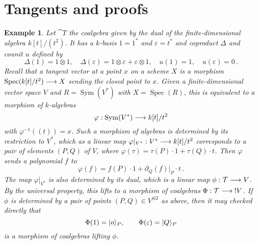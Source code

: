 \documentclass[english,letter paper,12pt,reqno]{article}
\DeclarePairedDelimiter\ket{\lvert}{\rangle}
\theoremstyle{example}
\newtheorem{definition}[theorem]{Definition}
\newtheorem{example}[theorem]{Example}
\numberwithin{equation}{section}
\DeclareMathOperator{\Spec}{Spec}
\DeclareMathOperator{\Sym}{Sym}
\begin{document}
\section{Tangents and proofs}\label{section:example_lifting}





\begin{example}\label{example:tangent_coalgebra} Let $\cat{T}$ the coalgebra given by the dual of the finite-dimensional algebra $k[t]/(t^2)$. It has a $k$-basis $1 = 1^*$ and $\varepsilon = t^*$ and coproduct $\Delta$ and counit $u$ defined by
\[
\Delta(1) = 1 \otimes 1, \quad \Delta( \varepsilon ) = 1 \otimes \varepsilon + \varepsilon \otimes 1, \quad u(1) = 1, \quad u(\varepsilon) = 0\,.
\]
Recall that a tangent vector at a point $x$ on a scheme $X$ is a morphism $\Spec(k[t]/t^2) \lto X$ sending the closed point to $x$. Given a finite-dimensional vector space $V$ and $R = \Sym(V^*)$ with $X = \Spec(R)$, this is equivalent to a morphism of $k$-algebras
\[
\varphi: \Sym(V^*) \lto k[t]/t^2
\]
with $\varphi^{-1}( (t) ) = x$. Such a morphism of algebras is determined by its restriction to $V^*$, which as a linear map $\varphi|_{V^*}: V^* \longrightarrow k[t]/t^2$ corresponds to a pair of elements $(P, Q)$ of $V$, where $\varphi( \tau ) = \tau(P) \cdot 1 + \tau(Q) \cdot t$. Then $\varphi$ sends a polynomial $f$ to
\[
\varphi(f) = f(P) \cdot 1 + \partial_Q( f )|_P \cdot t\,.
\]
The map $\varphi|_{V^*}$ is also determined by its dual, which is a linear map $\phi: \mathcal{T} \longrightarrow V$. By the universal property, this lifts to a morphism of coalgebras $\Phi: \mathcal{T} \longrightarrow {!}V$. If $\phi$ is determined by a pair of points $(P,Q) \in V^{\oplus 2}$ as above, then it may checked directly that
\[
\Phi( 1 ) = \ket{o}_P, \qquad \Phi( \varepsilon ) = \ket{ Q }_P
\]
is a morphism of coalgebras lifting $\phi$.
\end{example}
\end{document}
